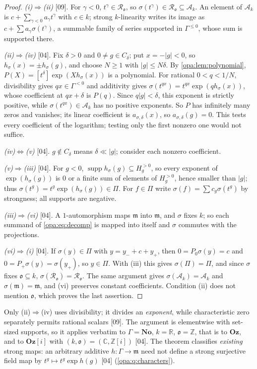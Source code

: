 \documentclass[11pt,oneside]{article}
\numberwithin{equation}{section}
\theoremstyle{definition}
\theoremstyle{remark}
\newcommand{\No}{\mathbf{No}}
\newcommand{\Oz}{\mathbf{Oz}}
\newcommand{\Og}{\mathbf{Oz}[i]}
\newcommand{\R}{\mathbb R}
\newcommand{\C}{\mathbb C}
\newcommand{\Z}{\mathbb Z}
\newcommand{\oo}{\mathfrak o}
\newcommand{\Ak}{\mathcal A_k}
\newcommand{\Ro}{\mathcal R_{\oo}}
\newcommand{\mm}{\mathfrak m}
\newcommand{\supp}{\operatorname{supp}}
\newcommand{\bb}{\mathbin{\ll}}
\newcommand{\coef}[2]{[t^{#1}]#2}
\newcommand{\src}[1]{\textup{\textsf{\small[#1]}}}
\begin{document}
\begin{proof}
\emph{(i)$\Rightarrow$(ii)} \src{09}. For $\gamma<0$, $t^\gamma\in\Ro$, so
$\sigma(t^\gamma)\in\Ro\subseteq\Ak$. An element of $\Ak$ is
$c+\sum_{\gamma<0}a_\gamma t^\gamma$ with $c\in k$; strong $k$-linearity writes
its image as $c+\sum a_\gamma\sigma(t^\gamma)$, a summable family of series
supported in $\Gamma^{\le0}$, whose sum is supported there.

\emph{(ii)$\Rightarrow$(iv)} \src{04}. Fix $\delta>0$ and $0\ne g\in C_\delta$;
put $x=-|g|<0$, so $h_\sigma(x)=\pm h_\sigma(g)$, and choose $N\ge1$ with
$|g|\le N\delta$. By \cref{opa:lem:polynomial},
$P(X)=\coef\delta{\exp(Xh_\sigma(x))}$ is a polynomial. For rational
$0<q<1/N$, divisibility gives $qx\in\Gamma^{<0}$ and additivity gives
$\sigma(t^{qx})=t^{qx}\exp(qh_\sigma(x))$, whose coefficient at $qx+\delta$ is
$P(q)$. Since $q|g|<\delta$, this exponent is strictly positive, while
$\sigma(t^{qx})\in\Ak$ has no positive exponents. So $P$ has infinitely many
zeros and vanishes; its linear coefficient is $a_{\sigma,\delta}(x)$, so
$a_{\sigma,\delta}(g)=0$. This tests every coefficient of the logarithm;
testing only the first nonzero one would not suffice.

\emph{(iv)$\Leftrightarrow$(v)} \src{04}. $g\notin C_\delta$ means
$\delta\bb|g|$; consider each nonzero coefficient.

\emph{(v)$\Rightarrow$(iii)} \src{04}. For $g<0$, $\supp h_\sigma(g)\subseteq
H_g^{>0}$, so every exponent of $\exp(h_\sigma(g))$ is $0$ or a finite sum of
elements of $H_g^{>0}$, hence smaller than $|g|$; thus
$\sigma(t^g)=t^g\exp(h_\sigma(g))\in\Pi$. For $f\in\Pi$ write
$\sigma(f)=\sum c_g\sigma(t^g)$ by strongness; all supports are negative.

\emph{(iii)$\Rightarrow$(vi)} \src{04}. A $1$-automorphism maps $\mm$ into
$\mm$, and $\sigma$ fixes $k$; so each summand of \eqref{opa:eq:decomp} is
mapped into itself and $\sigma$ commutes with the projections.

\emph{(vi)$\Rightarrow$(i)} \src{04}. If $\sigma(y)\in\Pi$ with
$y=y_-+c+y_+$, then $0=P_0\sigma(y)=c$ and $0=P_+\sigma(y)=\sigma(y_+)$, so
$y\in\Pi$. With (iii) this gives $\sigma(\Pi)=\Pi$, and since $\sigma$ fixes
$\oo\subseteq k$, $\sigma(\Ro)=\Ro$. The same argument gives
$\sigma(\Ak)=\Ak$ and $\sigma(\mm)=\mm$, and (vi) preserves constant
coefficients. Condition (ii) does not mention $\oo$, which proves the last
assertion.
\end{proof}

Only (ii)$\Rightarrow$(iv) uses divisibility; it divides an \emph{exponent},
while characteristic zero separately permits rational scalars \src{09}. The
argument is elementwise with set-sized supports, so it applies verbatim to
$\Gamma=\No$, $k=\R$, $\oo=\Z$, that is to $\Oz$, and to $\Og$ with $(k,\oo)=
(\C,\Z[i])$ \src{04}. The theorem classifies \emph{existing} strong maps: an
arbitrary additive $h:\Gamma\to\mm$ need not define a strong surjective field map
by $t^g\mapsto t^g\exp h(g)$ \src{04} (\cref{opa:q:characters}).
\end{document}
